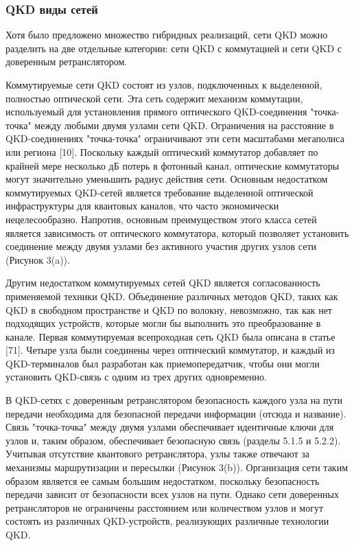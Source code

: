 \subsubsection{QKD виды сетей}
Хотя было предложено множество гибридных реализаций, сети QKD можно разделить на две отдельные категории: сети QKD с коммутацией и сети QKD с доверенным ретранслятором.

Коммутируемые сети QKD состоят из узлов, подключенных к выделенной, полностью оптической сети. Эта сеть содержит механизм коммутации, используемый для установления прямого оптического QKD-соединения "точка-точка" между любыми двумя узлами сети QKD. Ограничения на расстояние в QKD-соединениях "точка-точка" ограничивают эти сети масштабами мегаполиса или региона [10]. Поскольку каждый оптический коммутатор добавляет по крайней мере несколько дБ потерь в фотонный канал, оптические коммутаторы могут значительно уменьшить радиус действия сети.
Основным недостатком коммутируемых QKD-сетей является требование выделенной оптической инфраструктуры для квантовых каналов, что часто экономически нецелесообразно. Напротив, основным преимуществом этого класса сетей является зависимость от оптического коммутатора, который позволяет установить соединение между двумя узлами без активного участия других узлов сети (Рисунок 3(a)).

Другим недостатком коммутируемых сетей QKD является согласованность применяемой техники QKD.
Объединение различных методов QKD, таких как QKD в свободном пространстве и QKD по волокну, невозможно, так как нет подходящих устройств, которые могли бы выполнить это преобразование в канале. Первая коммутируемая всепроходная сеть QKD была описана в статье [71]. Четыре узла были соединены через оптический коммутатор, и каждый из QKD-терминалов был разработан как приемопередатчик, чтобы они могли установить QKD-связь с одним из трех других одновременно.

В QKD-сетях с доверенным ретранслятором безопасность каждого узла на пути передачи необходима для безопасной передачи информации (отсюда и название). Связь "точка-точка" между двумя узлами обеспечивает идентичные ключи для узлов и, таким образом, обеспечивает безопасную связь (разделы 5.1.5 и 5.2.2). Учитывая отсутствие квантового ретранслятора, узлы также отвечают за механизмы маршрутизации и пересылки (Рисунок 3(b)). Организация сети таким образом является ее самым большим недостатком, поскольку безопасность передачи зависит от безопасности всех узлов на пути. Однако сети доверенных ретрансляторов не ограничены расстоянием или количеством узлов и могут состоять из различных QKD-устройств, реализующих различные технологии QKD.

